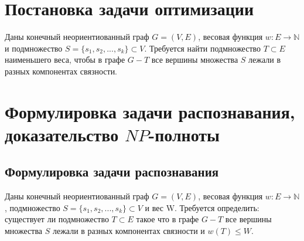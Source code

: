 \newpage
\section{Постановка задачи оптимизации}
Даны конечный неориентиованный граф \(G=(V,E)\), весовая функция \(w:E\rightarrow \mathbb{N}\) и подмножество \(S = \{s_1, s_2,...,s_k\}\subset V\). Требуется найти подмножество \(T\subset E\) наименьшего веса, чтобы в графе \(G - T\) все вершины множества \(S\) лежали в разных компонентах связности.

\section{Формулировка задачи распознавания, доказательство \(NP\)-полноты}
\subsection{Формулировка задачи распознавания}
Даны конечный неориентиованный граф \(G=(V,E)\), весовая функция \(w:E\rightarrow \mathbb{N}\), подмножество \(S = \{s_1, s_2,...,s_k\}\subset V\) и вес W. Требуется определить: существует ли подмножество \(T\subset E\) такое что в графе \(G - T\) все вершины множества \(S\) лежали в разных компонентах связности и \(w(T) \leq W\).

